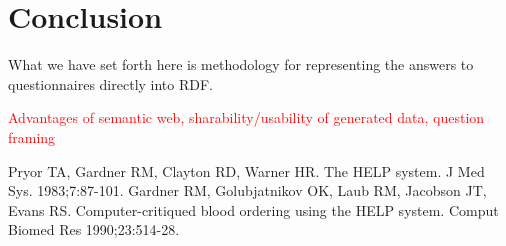 \documentclass{amia}
\begin{document}
\section*{Conclusion}
What we have set forth here is methodology for representing the answers to questionnaires directly into RDF.

\textcolor{red}{Advantages of semantic web, sharability/usability of generated data, question framing}

\makeatletter
\renewcommand{\@biblabel}[1]{\hfill #1.}
\makeatother


\begin{thebibliography}{1}
\setlength\itemsep{-0.1em}

Pryor TA, Gardner RM, Clayton RD, Warner HR. The HELP system. J Med Sys. 1983;7:87-101.
Gardner RM, Golubjatnikov OK, Laub RM, Jacobson JT, Evans RS. Computer-critiqued blood ordering using the HELP system. Comput Biomed Res 1990;23:514-28.

\end{thebibliography}
\end{document}
